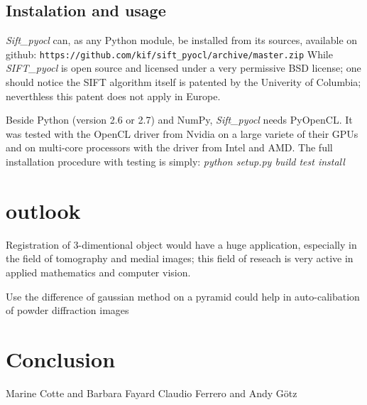 \documentclass[preprint]{iucr}
\begin{document}
\subsection{Instalation and usage}
\emph{Sift\_pyocl} can, as any Python module, be installed from its sources,
available on github:
\verb|https://github.com/kif/sift_pyocl/archive/master.zip|
While \emph{SIFT\_pyocl} is open source and licensed under a very
permissive BSD license; one should notice the SIFT algorithm itself is
patented by the Univerity of Columbia\cite{SIFT}; neverthless this patent does
not apply in Europe. %

Beside Python (version 2.6 or 2.7) and NumPy, \emph{Sift\_pyocl} needs
PyOpenCL\cite{pyopencl}.
It was tested with the OpenCL\cite{opencl} driver from Nvidia on a
large variete of their GPUs and on multi-core processors with the driver from
Intel and AMD. The full installation procedure with testing is simply:
\emph{python setup.py build test install}

\section{outlook}

Registration of 3-dimentional object would have a huge application, especially
in the field of tomography and medial images; this field of reseach is very
active in applied mathematics and computer vision.

Use the difference of gaussian method on a pyramid could help in auto-calibation
of powder diffraction images 

\section{Conclusion}

Marine Cotte and Barbara Fayard
Claudio Ferrero and Andy G\"otz





\end{document}
